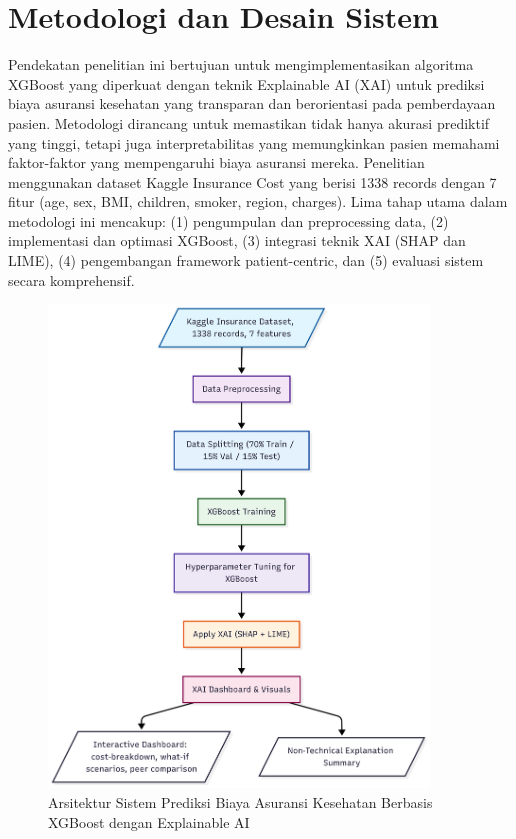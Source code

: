 \chapter{Metodologi dan Desain Sistem}

Pendekatan penelitian ini bertujuan untuk mengimplementasikan algoritma XGBoost yang diperkuat dengan teknik Explainable AI (XAI) untuk prediksi biaya asuransi kesehatan yang transparan dan berorientasi pada pemberdayaan pasien. Metodologi dirancang untuk memastikan tidak hanya akurasi prediktif yang tinggi, tetapi juga interpretabilitas yang memungkinkan pasien memahami faktor-faktor yang mempengaruhi biaya asuransi mereka. Penelitian menggunakan dataset Kaggle Insurance Cost yang berisi 1338 records dengan 7 fitur (age, sex, BMI, children, smoker, region, charges). Lima tahap utama dalam metodologi ini mencakup: (1) pengumpulan dan preprocessing data, (2) implementasi dan optimasi XGBoost, (3) integrasi teknik XAI (SHAP dan LIME), (4) pengembangan framework patient-centric, dan (5) evaluasi sistem secara komprehensif.

\begin{figure}[H]
  \centering
  \includegraphics[width=0.9\textwidth]{XGBoost_XAI_Architecture.png}
  \caption{Arsitektur Sistem Prediksi Biaya Asuransi Kesehatan Berbasis XGBoost dengan Explainable AI}
  \label{fig:system_architecture}
\end{figure}

